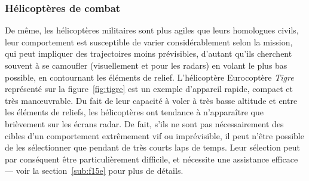 



	
	\subsubsection{Hélicoptères de combat}
	De même, les hélicoptères militaires sont plus agiles que leurs homologues civils, leur comportement est susceptible de varier considérablement selon la mission, qui peut impliquer des trajectoires moins prévisibles, d'autant qu'ils cherchent souvent à se camoufler (visuellement et pour les radars) en volant le plus bas possible, en contournant les éléments de relief. L'hélicoptère Eurocoptère \emph{Tigre} représenté sur la figure~\ref{fig:tigre} est un exemple d'appareil rapide, compact et très manœuvrable. Du fait de leur capacité à voler à très basse altitude et entre les éléments de reliefs, les hélicoptères ont tendance à n'apparaître que brièvement sur les écrans radar. De fait, s'ils ne sont pas nécessairement des cibles d'un comportement extrêmement vif ou imprévisible, il peut n'être possible de les sélectionner que pendant de très courts laps de temps. Leur sélection peut par conséquent être particulièrement difficile, et nécessite une assistance efficace --- voir la section~\ref{sub:f15e} pour plus de détails.
	
